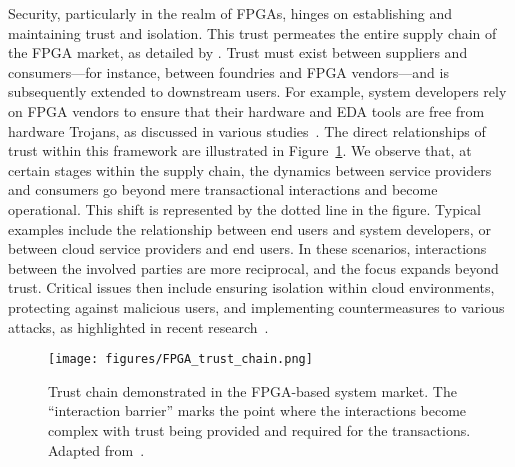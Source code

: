 
Security, particularly in the realm of FPGAs, hinges on establishing and maintaining trust and isolation. This trust permeates the entire supply chain of the FPGA market, as detailed by \citet{Zhang2014ASystems}. Trust must exist between suppliers and consumers—for instance, between foundries and FPGA vendors—and is subsequently extended to downstream users. For example, system developers rely on FPGA vendors to ensure that their hardware and EDA tools are free from hardware Trojans, as discussed in various studies~\cite{Zeitouni2021TrustedFPGAs,Labafniya2020OnPrevention,Nikiema2023TowardsDevices,Palumbo2022IsAnswer}. The direct relationships of trust within this framework are illustrated in Figure~\ref{fig:FPGA-trust}. We observe that, at certain stages within the supply chain, the dynamics between service providers and consumers go beyond mere transactional interactions and become operational. This shift is represented by the dotted line in the figure. %
Typical examples include the relationship between end users and system developers, or between cloud service providers and end users. In these scenarios, interactions between the involved parties are more reciprocal, and the focus expands beyond trust. Critical issues then include ensuring isolation within cloud environments, protecting against malicious users, and implementing countermeasures to various attacks, as highlighted in recent research~\cite{Zeitouni2021TrustedFPGAs,Koylu2022ExploitingAttacks,Garaffa2021RevealingNeuron,Socha2020Side-channelHardware}.

\begin{figure}
    \centering
    \texttt{[image: figures/FPGA\_trust\_chain.png]}
    \caption{Trust chain demonstrated in the FPGA-based system market. The ``interaction barrier'' marks the point where the interactions become complex with trust being provided and required for the transactions. Adapted from~\cite{Zhang2014ASystems}.}
    \label{fig:FPGA-trust}
\end{figure}

